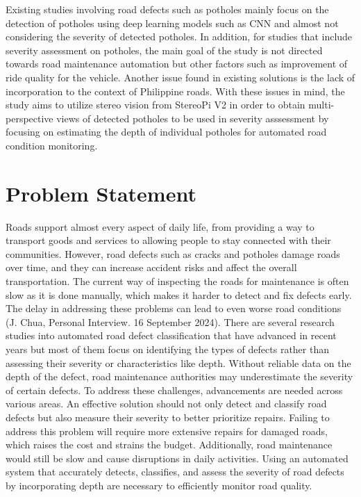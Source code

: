 Existing studies involving road defects such as potholes mainly focus on the detection of potholes using deep learning models such as CNN and almost not considering the severity of detected potholes. In addition, for studies that include severity assessment on potholes, the main goal of the study is not directed towards road maintenance automation but other factors such as improvement of ride quality for the vehicle. Another issue found in existing solutions is the lack of incorporation to the context of Philippine roads. With these issues in mind, the study aims to utilize stereo vision from StereoPi V2 in order to obtain multi-perspective views of detected potholes to be used in severity asssessment by focusing on estimating the depth of individual potholes for automated road condition monitoring.


\section{Problem Statement}
Roads support almost every aspect of daily life, from providing a way to transport goods and services to allowing people to stay connected with their communities. However, road defects such as cracks and potholes damage roads over time, and they can increase accident risks and affect the overall transportation. The current way of inspecting the roads for maintenance is often slow as it is done manually, which makes it harder to detect and fix defects early. The delay in addressing these problems can lead to even worse road conditions (J. Chua, Personal Interview. 16 September 2024). There are several research studies into automated road defect classification that have advanced in recent years but most of them focus on identifying the types of defects rather than assessing their severity or characteristics like depth. Without reliable data on the depth of the defect, road maintenance authorities may underestimate the severity of certain defects. To address these challenges, advancements are needed across various areas. An effective solution should not only detect and classify road defects but also measure their severity to better prioritize repairs. Failing to address this problem will require more extensive repairs for damaged roads, which raises the cost and strains the budget. Additionally, road maintenance would still be slow and cause disruptions in daily activities. Using an automated system that accurately detects, classifies, and assess the severity of road defects by incorporating depth are necessary to efficiently monitor road quality.


